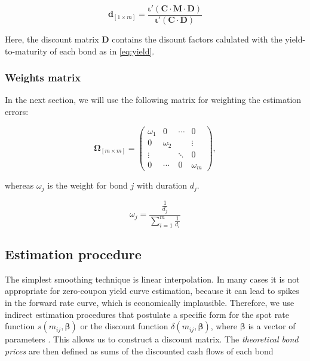 \begin{equation*}
  \label{eq:macaulayduration}
  \bm{d}_{\left[1\times m\right]} = \frac{\bm{\iota}'(\bm{C}\cdot\bm{M}\cdot\bm{D})}{\bm{\iota}'(\bm{C}\cdot\bm{D})}
\end{equation*}

Here, the discount matrix $\bm{D}$ contains the disount factors calulated with the yield-to-maturity of each bond as in \eqref{eq:yield}.

\subsubsection*{Weights matrix}

In the next section, we will use the following matrix for weighting the estimation errors:


\begin{equation*}\label{weights}
    \bm{\Omega}_{\left[m\times m\right]}= \begin{pmatrix}
 \omega_1 & 0 &\cdots  &0  \\
 0 & \omega_2 &  & \vdots \\
 \vdots &  & \ddots & 0 \\
 0 &\cdots  &0  & \omega_m
\end{pmatrix},
\end{equation*}


whereas $\omega_j$ is the weight for bond $j$ with duration $d_j$.

\begin{equation}
\label{eq:durationweight}
    \omega_j=\frac{\frac{1}{d_j}}{\sum_{i=1}^m\frac{1}{d_i}}
\end{equation}


\subsection{Estimation procedure}
\label{sec:estimation}

The simplest smoothing technique is linear interpolation. In many cases it is not appropriate for zero-coupon yield curve estimation, because it can lead to spikes in the forward rate curve, which is economically implausible. Therefore, we use indirect estimation procedures that postulate a specific form for the spot rate function $s(m_{ij}, \bm{\beta})$ or the discount function $\delta(m_{ij}, \bm{\beta})$, where $\bm{\beta}$ is a vector of parameters \citep[see, e.g.][]{Martellini2003}. This allows us to construct a discount matrix. The \emph{theoretical bond prices} are then defined as sums of the discounted cash flows of each bond

